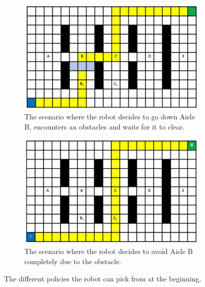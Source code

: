 \documentclass[a4paper,12pt]{article}
\begin{document}
			\begin{figure}[H]
				\centering
				\begin{subfigure}{.4\textwidth}
					\centering
					\includegraphics[width=\linewidth]{blockedAisleB.png}
					\caption{The scenario where the robot decides to go down Aisle B, encounters an obstacles and waits for it to clear.}
					\label{fig:plannedPathAisleB}
				\end{subfigure}
				\begin{subfigure}{.4\textwidth}
					\centering
					\includegraphics[width=\linewidth]{plannedPathAisleC.png}
					\caption{The scenario where the robot decides to avoid Aisle B completely due to the obstacle.}
					\label{fig:plannedPathAisleC}
				\end{subfigure}
				\caption{The different policies the robot can pick from at the beginning.}
				\label{fig:task1_2Figures}
			\end{figure}
			
\end{document}
